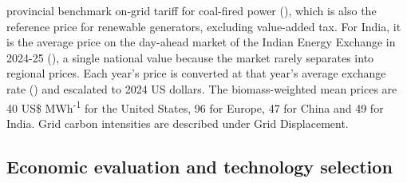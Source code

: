 \documentclass[
  letterpaper,
]{article}
\begin{document}
provincial benchmark on-grid tariff for coal-fired power
(), which is also the reference price
for renewable generators, excluding value-added tax. For India, it is
the average price on the day-ahead market of the Indian Energy Exchange
in 2024-25 (), a single national
value because the market rarely separates into regional prices. Each
year's price is converted at that year's average exchange rate
() and escalated to 2024 US
dollars. The biomass-weighted mean prices are 40 US\$
MWh\textsuperscript{-1} for the United States, 96 for Europe, 47 for
China and 49 for India. Grid carbon intensities are described under Grid
Displacement.

\subsection{Economic evaluation and technology
selection}\label{economic-evaluation-and-technology-selection}
\end{document}
